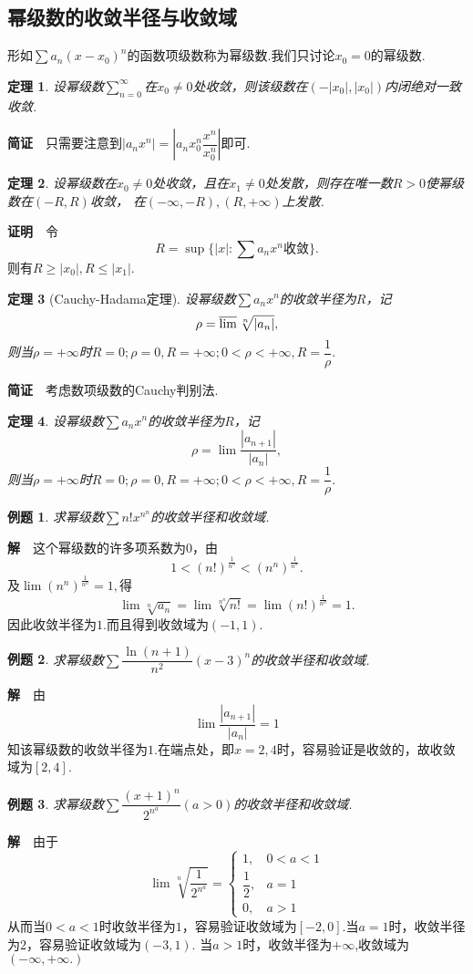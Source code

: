 \documentclass[UTF8]{article}
\newcommand{\zm}{\textbf{证明}$\quad$}
\newcommand{\jz}{\textbf{简证}$\quad$}
\newcommand{\jie}{\textbf{解}$\quad$}
\newtheorem{thm}{\hspace{2em}定理}[section]
\newtheorem{exa}{\hspace{2em}例题}[section]
\begin{document}
\subsection{幂级数的收敛半径与收敛域}
  形如$\sum a_n(x-x_0)^n$的函数项级数称为幂级数.我们只讨论$x_0=0$的幂级数.
  \begin{thm}
    设幂级数$\sum\limits_{n=0}^\infty$在$x_0\ne 0$处收敛，则该级数在$(-|x_0|,|x_0|)$内闭绝对一致收敛.
  \end{thm}
  \jz 只需要注意到$|a_nx^n|=\left|a_nx_0^n\dfrac{x^n}{x_0^n}\right|$即可.
  \begin{thm}
    设幂级数在$x_0\ne0$处收敛，且在$x_1\ne 0$处发散，则存在唯一数$R>0$使幂级数在$(-R,R)$收敛，
    在$(-\infty,-R),(R,+\infty)$上发散.
  \end{thm}
  \zm 令
  $$R=\sup\{|x|:\sum a_nx^n\text{收敛}\}.$$
  则有$R\ge |x_0|,R\le|x_1|.$
  \begin{thm}[Cauchy-Hadama定理]
    设幂级数$\sum a_nx^n$的收敛半径为$R$，记
    $$\rho=\varlimsup\sqrt[n]{|a_n|},$$
    则当$\rho=+\infty$时$R=0;\rho=0,R=+\infty;0<\rho<+\infty,R=\dfrac{1}{\rho}.$
  \end{thm}
  \jz 考虑数项级数的Cauchy判别法.
  \begin{thm}
    设幂级数$\sum a_nx^n$的收敛半径为$R$，记
    $$\rho=\lim\dfrac{|a_{n+1}|}{|a_n|},$$
    则当$\rho=+\infty$时$R=0;\rho=0,R=+\infty;0<\rho<+\infty,R=\dfrac{1}{\rho}.$
  \end{thm}
  \begin{exa}
    求幂级数$\sum n!x^{n^n}$的收敛半径和收敛域.
  \end{exa}
  \jie 这个幂级数的许多项系数为0，由
  $$1<(n!)^\frac{1}{n^n}<(n^n)^\frac{1}{n^n}.$$
  及$\lim(n^n)^\frac{1}{n^n}=1,$得
  $$\lim\sqrt[n]{a_n}=\lim\sqrt[n^n]{n!}=\lim(n!)^\frac{1}{n^n}=1.$$
  因此收敛半径为$1$.而且得到收敛域为$(-1,1).$
  \begin{exa}
    求幂级数$\sum\dfrac{\ln(n+1)}{n^2}(x-3)^n$的收敛半径和收敛域.
  \end{exa}
  \jie 由
  $$\lim\dfrac{|a_{n+1}|}{|a_n|}=1$$
  知该幂级数的收敛半径为$1$.在端点处，即$x=2,4$时，容易验证是收敛的，故收敛域为$[2,4]$.
  \begin{exa}
    求幂级数$\sum\dfrac{(x+1)^n}{2^{n^a}}(a>0)$的收敛半径和收敛域.
  \end{exa}
  \jie 由于
  $$\lim\sqrt[n]{\dfrac{1}{2^{n^a}}}=\begin{cases}1,&0<a<1\\ \dfrac{1}{2},&a=1\\ 0,&a>1 \end{cases}$$
  从而当$0<a<1$时收敛半径为$1$，容易验证收敛域为$[-2,0]$.当$a=1$时，收敛半径为$2$，容易验证收敛域为$(-3,1).$
  当$a>1$时，收敛半径为$+\infty$,收敛域为$(-\infty,+\infty.)$
  \clearpage
\end{document}
